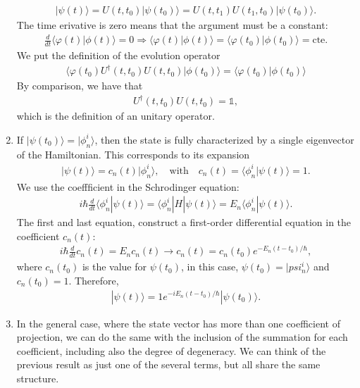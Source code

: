 \documentclass[letterpaper,11pt,twoside]{article}
\newcommand{\ket}[1]{|#1\rangle}
\newcommand{\braket}[1]{\langle#1\rangle}
\begin{document}
\begin{enumerate}[itemsep=0pt,topsep=0pt,label=\alph*)]
\begin{align}
    \ket{\psi(t)}=U(t,t_0)\ket{\psi(t_0)}=U(t,t_1)U(t_1,t_0)\ket{\psi(t_0)}.
  \end{align}
  The time erivative is zero means that the argument must be a constant:
  \begin{align*}
    \frac{d}{dt}\braket{\varphi(t)|\phi(t)}=0\Longrightarrow \braket{\varphi(t)|\phi(t)}=\braket{\varphi(t_0)|\phi(t_0)}=\text{cte}.
  \end{align*}
  We put the definition of the evolution operator
  \begin{align*}
    \braket{\varphi(t_0)U^\dagger(t,t_0)U(t,t_0)|\phi(t_0)}=\braket{\varphi(t_0)|\phi(t_0)}
  \end{align*}
  By comparison, we have that 
  \begin{align*}
    U^\dagger(t,t_0)U(t,t_0)=\mathds{1},
  \end{align*}
  which is the definition of an unitary operator.
  \item If $\ket{\psi(t_0)}=\ket{\phi_n^i}$, then the state is fully characterized by a single eigenvector of the Hamiltonian. This corresponds to its expansion
  \begin{align*}
    \ket{\psi(t)}=c_n(t)\ket{\phi_n^i},\quad\text{with}\quad c_n(t)=\braket{\phi_n^i|\psi(t)}=1.
  \end{align*} 
    We use the coeffficient in the Schrodinger equation:
    \begin{align*}
      i\hbar\frac{d}{dt}\braket{\phi_n^i|\psi(t)}=\braket{\phi_n^i|H|\psi(t)}=E_n\braket{\phi_n^i|\psi(t)}.
    \end{align*}
    The first and last equation, construct a first-order differential equation in the coefficient $c_n(t)$:
    \begin{align*}
      i\hbar\frac{d}{dt}c_n(t)=E_nc_n(t)\longrightarrow c_n(t)=c_n(t_0)e^{-E_n(t-t_0)/\hbar},
    \end{align*}
    where $c_n(t_0)$ is the value for $\psi(t_0)$, in this case, $\psi(t_0)=\ket{psi_n^i}$ and $c_n(t_0)=1$. Therefore,
    \begin{align*}
      \ket{\psi(t)}=1e^{-iE_n(t-t_0)/\hbar}\ket{\psi(t_0)}.
    \end{align*}
  \item In the general case, where the state vector has more than one coefficient of projection, we can do the same with the inclusion of the summation for each coefficient, including 
  also the degree of degeneracy. We can think of the previous result as just one of the several terms, but all share the same structure.

\end{enumerate}
\end{document}
